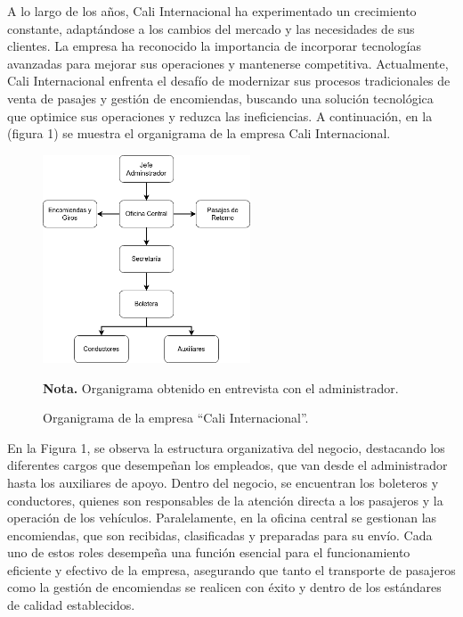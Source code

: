 \documentclass[12pt,letterpaper]{article}
\begin{document}
A lo largo de los años, Cali Internacional ha experimentado un crecimiento constante, adaptándose a los cambios del mercado y las necesidades de sus clientes. La empresa ha reconocido la importancia de incorporar tecnologías avanzadas para mejorar sus operaciones y mantenerse competitiva. Actualmente, Cali Internacional enfrenta el desafío de modernizar sus procesos tradicionales de venta de pasajes y gestión de encomiendas, buscando una solución tecnológica que optimice sus operaciones y reduzca las ineficiencias. A continuación, en la (figura 1) se muestra el organigrama de la empresa Cali Internacional.

\vspace{0.3cm} %

\begin{figure}[h] %
	\caption[Descripción corta]
	{\newline Organigrama de la empresa ``Cali Internacional''.} %
	\centering
	\includegraphics[width=0.55\textwidth]{img/Organigrama.png} %
	
	\begin{flushleft}
		\hspace{1.20cm} \textbf{Nota.} Organigrama obtenido en entrevista con el administrador. %
	\end{flushleft}
	\vspace{-16pt}
	\label{fig:figura2_1} %
\end{figure}

En la Figura 1, se observa la estructura organizativa del negocio, destacando los diferentes cargos que desempeñan los empleados, que van desde el administrador hasta los auxiliares de apoyo. Dentro del negocio, se encuentran los boleteros y conductores, quienes son responsables de la atención directa a los pasajeros y la operación de los vehículos. Paralelamente, en la oficina central se gestionan las encomiendas, que son recibidas, clasificadas y preparadas para su envío. Cada uno de estos roles desempeña una función esencial para el funcionamiento eficiente y efectivo de la empresa, asegurando que tanto el transporte de pasajeros como la gestión de encomiendas se realicen con éxito y dentro de los estándares de calidad establecidos.
\end{document}
